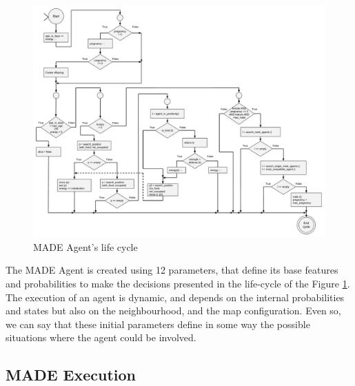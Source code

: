\documentclass[runningheads]{llncs}
\begin{document}
\begin{figure}
\begin{center}
\includegraphics[scale=0.32]{img/life_cycle.pdf}
\caption{MADE Agent's life cycle}
\label{fig:lifecycle}
\end{center}
\end{figure}




The MADE Agent is created using 12 parameters, that define its base features and probabilities to make the decisions presented in the life-cycle of the Figure \ref{fig:lifecycle}. The execution of an agent is dynamic, and depends on the internal probabilities and states but also on the neighbourhood, and the map configuration. Even so, we can say that these initial parameters define in some way the possible situations where the agent could be involved.


\subsection{MADE Execution}
\end{document}
